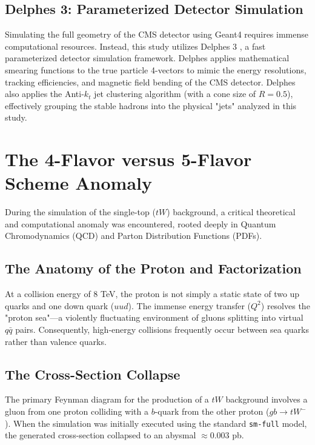 \documentclass[11pt,a4paper]{article}
\begin{document}
\subsection{Delphes 3: Parameterized Detector Simulation}
Simulating the full geometry of the CMS detector using Geant4 requires immense computational resources. Instead, this study utilizes Delphes 3 \cite{delphes}, a fast parameterized detector simulation framework. Delphes applies mathematical smearing functions to the true particle 4-vectors to mimic the energy resolutions, tracking efficiencies, and magnetic field bending of the CMS detector. Delphes also applies the Anti-$k_t$ jet clustering algorithm (with a cone size of $R=0.5$), effectively grouping the stable hadrons into the physical "jets" analyzed in this study.

\section{The 4-Flavor versus 5-Flavor Scheme Anomaly}
During the simulation of the single-top ($tW$) background, a critical theoretical and computational anomaly was encountered, rooted deeply in Quantum Chromodynamics (QCD) and Parton Distribution Functions (PDFs).

\subsection{The Anatomy of the Proton and Factorization}
At a collision energy of 8 TeV, the proton is not simply a static state of two up quarks and one down quark ($uud$). The immense energy transfer ($Q^2$) resolves the "proton sea"—a violently fluctuating environment of gluons splitting into virtual $q\bar{q}$ pairs. Consequently, high-energy collisions frequently occur between sea quarks rather than valence quarks.

\subsection{The Cross-Section Collapse}
The primary Feynman diagram for the production of a $tW$ background involves a gluon from one proton colliding with a $b$-quark from the other proton ($gb \rightarrow tW^{-}$). When the simulation was initially executed using the standard \texttt{sm-full} model, the generated cross-section collapsed to an abysmal $\approx 0.003$ pb. 
\end{document}
